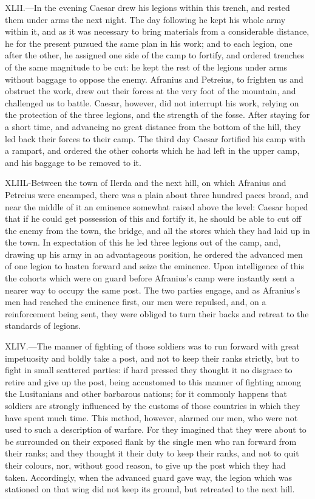XLII.—In the evening Caesar drew his legions within this trench, and
rested them under arms the next night. The day following he kept his
whole army within it, and as it was necessary to bring materials from a
considerable distance, he for the present pursued the same plan in his
work; and to each legion, one after the other, he assigned one side of
the camp to fortify, and ordered trenches of the same magnitude to be
cut: he kept the rest of the legions under arms without baggage to
oppose the enemy. Afranius and Petreius, to frighten us and obstruct the
work, drew out their forces at the very foot of the mountain, and
challenged us to battle. Caesar, however, did not interrupt his work,
relying on the protection of the three legions, and the strength of the
fosse. After staying for a short time, and advancing no great distance
from the bottom of the hill, they led back their forces to their camp.
The third day Caesar fortified his camp with a rampart, and ordered the
other cohorts which he had left in the upper camp, and his baggage to be
removed to it.

XLIIL-Between the town of Ilerda and the next hill, on which Afranius
and Petreius were encamped, there was a plain about three hundred paces
broad, and near the middle of it an eminence somewhat raised above the
level: Caesar hoped that if he could get possession of this and fortify
it, he should be able to cut off the enemy from the town, the bridge,
and all the stores which they had laid up in the town. In expectation of
this he led three legions out of the camp, and, drawing up his army in
an advantageous position, he ordered the advanced men of one legion to
hasten forward and seize the eminence. Upon intelligence of this the
cohorts which were on guard before Afranius's camp were instantly sent a
nearer way to occupy the same post. The two parties engage, and as
Afranius's men had reached the eminence first, our men were repulsed,
and, on a reinforcement being sent, they were obliged to turn their
backs and retreat to the standards of legions.

XLIV.—The manner of fighting of those soldiers was to run forward with
great impetuosity and boldly take a post, and not to keep their ranks
strictly, but to fight in small scattered parties: if hard pressed they
thought it no disgrace to retire and give up the post, being accustomed
to this manner of fighting among the Lusitanians and other barbarous
nations; for it commonly happens that soldiers are strongly influenced
by the customs of those countries in which they have spent much time.
This method, however, alarmed our men, who were not used to such a
description of warfare. For they imagined that they were about to be
surrounded on their exposed flank by the single men who ran forward from
their ranks; and they thought it their duty to keep their ranks, and not
to quit their colours, nor, without good reason, to give up the post
which they had taken. Accordingly, when the advanced guard gave way, the
legion which was stationed on that wing did not keep its ground, but
retreated to the next hill.

